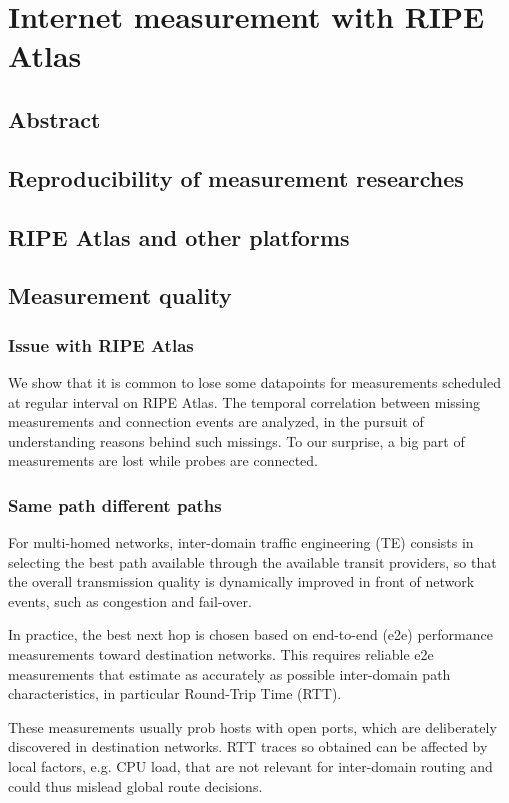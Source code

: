 \chapter{Internet measurement with RIPE Atlas}
\label{sec:ripe_atlas}
\section*{Abstract}

\section{Reproducibility of measurement researches}
\section{RIPE Atlas and other platforms}
\section{Measurement quality}
\subsection{Issue with RIPE Atlas}
We show that it is common to lose some datapoints for measurements scheduled at regular interval on RIPE Atlas. 
The temporal correlation between missing measurements and connection events are %
analyzed, in the pursuit of understanding reasons behind such missings.
To our surprise, a big part of measurements are lost while probes are connected.
\subsection{Same path different paths}
For multi-homed networks, inter-domain traffic engineering (TE) 
consists in selecting the best path available through the available transit providers,
so that the overall transmission quality is dynamically improved in front of network events, such as congestion and fail-over. 

In practice, the best next hop is chosen based on end-to-end (e2e) performance measurements toward destination networks. 
This requires reliable e2e measurements that estimate as accurately as possible inter-domain path characteristics, in particular Round-Trip Time (RTT).

These measurements usually prob
hosts with open ports, which are deliberately discovered in destination networks.
RTT traces so obtained can be affected by local factors, e.g. CPU load, that are not relevant for inter-domain routing and could thus mislead global route decisions. 


